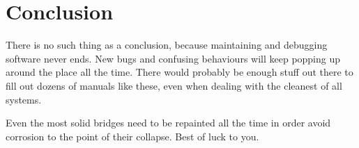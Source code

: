 \documentclass[11pt, oneside]{book}   	%
\begin{document}








\chapter{Conclusion}

There is no such thing as a conclusion, because maintaining and debugging software never ends. New bugs and confusing behaviours will keep popping up around the place all the time. There would probably be enough stuff out there to fill out dozens of  manuals like these, even when dealing with the cleanest of all systems.

Even the most solid bridges need to be repainted all the time in order avoid corrosion to the point of their collapse. Best of luck to you.
\end{document}
